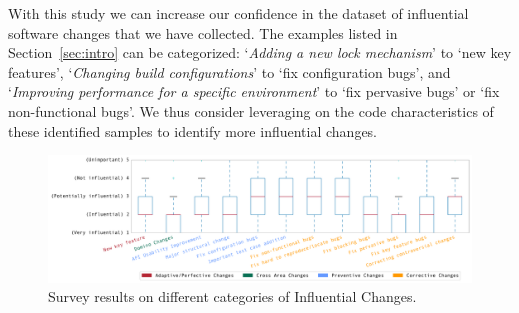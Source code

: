 With this study we can increase our confidence in the dataset of influential
software changes that we have collected. The examples listed in Section~\ref{sec:intro} can be categorized: `\textit{Adding a new lock mechanism}' to `new key features', `\textit{Changing build configurations}' to `fix configuration bugs', and `\textit{Improving performance for a specific environment}' to `fix pervasive bugs' or `fix non-functional bugs'.
We thus consider leveraging on the
code characteristics of these identified samples to identify more influential
changes.




\begin{landscape}

 \begin{figure}
 \centering
\scriptsize
\includegraphics[width=\linewidth]{fig/response-boxplot.pdf}
\caption{Survey results on different categories of Influential Changes.}
\label{fig:survey}
 \end{figure}

\end{landscape}

